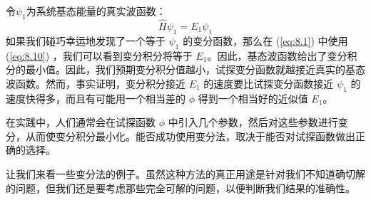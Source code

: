    令$\psi_1$为系统基态能量的真实波函数：
    \begin{equation}
        \hat{H}\psi_1 = E_1 \psi_1
        \label{eq:8.10}
    \end{equation}
    如果我们碰巧幸运地发现了一个等于 $\psi_1$ 的变分函数，那么在 (\ref{eq:8.1}) 中使用 (\ref{eq:8.10}) ，我们可以看到变分积分将等于 $E_1$。因此，基态波函数给出了变分积分的最小值。因此，我们预期变分积分值越小，试探变分函数就越接近真实的基态波函数。然而，事实证明，变分积分接近 $E_1$ 的速度要比试探变分函数接近 $\psi_1$ 的速度快得多，而且有可能用一个相当差的 $\phi$ 得到一个相当好的近似值 $E_1$。

    在实践中，人们通常会在试探函数 $\phi$ 中引入几个参数，然后对这些参数进行变分，从而使变分积分最小化。能否成功使用变分法，取决于能否对试探函数做出正确的选择。

    让我们来看一些变分法的例子。虽然这种方法的真正用途是针对我们不知道确切解的问题，但我们还是要考虑那些完全可解的问题，以便判断我们结果的准确性。

